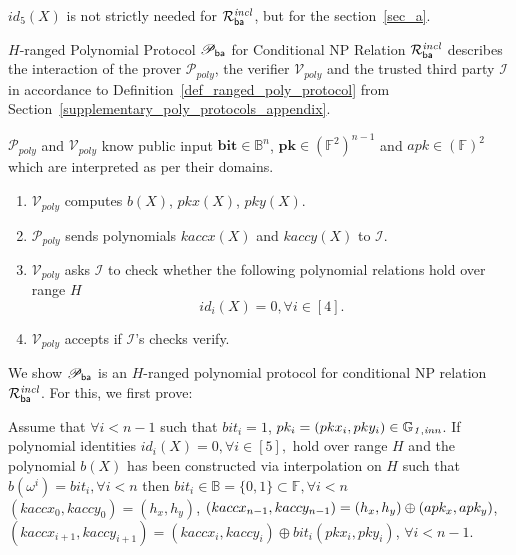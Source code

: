 \noindent %
$id_5(X)$ is not strictly needed for %
$\mathcal{R}^{\mathit{incl}}_{\mathsf{ba}}$, but %
for the section~\ref{sec_a}. \\
\vspace{-0.10in}

\noindent \textsf{$H$-ranged Polynomial Protocol $\mathscr{P}_{\mathsf{ba}}$ for Conditional NP Relation $\mathcal{R}^{\mathit{incl}}_{\mathsf{ba}}$} describes the interaction of the prover 
$\mathcal{P}_{poly}$, the verifier $\mathcal{V}_{poly}$ and the trusted third party $\mathcal{I}$ 
in accordance to 
Definition~\ref{def_ranged_poly_protocol} from Section~\ref{supplementary_poly_protocols_appendix}. \\
\vspace{-0.15in}

\noindent $\mathcal{P}_{poly}$ and $\mathcal{V}_{poly}$ know public input 
$\mathbf{bit} \in \mathbb{B}^n$, $\mathbf{pk} \in (\mathbb{F}^2)^{n-1}$ and $\mathit{apk} \in (\mathbb{F})^2$ 
which are interpreted as per their %
domains.
\begin{enumerate}
\item $\mathcal{V}_{poly}$ computes $b(X)$, $pkx(X)$, $pky(X)$.
\item $\mathcal{P}_{poly}$ sends polynomials $kaccx(X)$ and $kaccy(X)$ to $\mathcal{I}$. 
\item $\mathcal{V}_{poly}$ asks $\mathcal{I}$ to check whether the following polynomial relations hold over range $H$ 
$$id_i(X) = 0, \forall i \in [4].$$
\item $\mathcal{V}_{poly}$  accepts if $\mathcal{I}$'s checks verify. 
\end{enumerate}

\noindent We show $\mathscr{P}_{\mathsf{ba}}$ is an $H$-ranged polynomial protocol for 
conditional NP relation $\mathcal{R}^{\mathit{incl}}_{\mathsf{ba}}$. For this, we first prove:
\vspace{-0.05in}
\begin{test_claim} Assume that $\forall i < n-1$ such that $\mathit{bit}_i = 1$, $pk_i = (pkx_i, pky_i) \in \mathbb{G}_{\mathit{1,inn}}$. 
If polynomial identities $id_i(X) = 0, \forall i \in [5],$ hold over range 
$H$ and the polynomial $b(X)$ has been constructed via interpolation on $H$ such that $b(\omega^i) = \mathit{bit}_i, \forall i <n$ then $\mathit{bit}_i \in \mathbb{B} = \{0,1\} \subset \mathbb{F}, \forall i <n$ \\
$(kaccx_{0}, kaccy_{0}) = (h_x, h_y)$, $(kaccx_{n-1}, kaccy_{n-1}) = (h_x, h_y)\\ \oplus (apk_x, apk_y)$, 
$(kaccx_{i+1}, kaccy_{i+1}) =  (kaccx_{i}, kaccy_{i}) \oplus \mathit{bit}_i(pkx_{i}, pky_{i})$, $\forall i < n-1$.
\label{claim:keys_affine_comm}
\end{test_claim}
\vspace{-0.08in}

